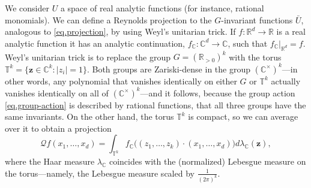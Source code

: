 \documentclass[twoside,11pt]{article}
\begin{document}
We consider $U$ a space of real analytic functions (for instance, rational monomials). We can define a Reynolds projection to the $G$-invariant functions $\bar U$, analogous to \eqref{eq.projection}, by using Weyl's unitarian trick. If $f: \mathbb R^d \to \mathbb R$ is a real analytic function it has an analytic continuation, $f_{\mathbb C}: \mathbb C^d \to \mathbb C$, such that $f_{\mathbb C}|_{\mathbb R^d} = f$. Weyl's unitarian trick is to replace the group $G = (\mathbb R_{> 0})^k$ with the torus %
$\mathbb T^k={ \{\mathbf z\in \mathbb C^k: |z_i|=1 \}}$. Both groups are Zariski-dense in the group $(\mathbb C^\times)^k$---in other words, any polynomial that vanishes identically on either $G$ or $\mathbb T^k$ actually vanishes identically on all of $(\mathbb C^\times)^k$---and it follows, because the group action \eqref{eq.group-action} is described by rational functions, that all three groups have the same invariants. On the other hand, the torus $\mathbb T^k$ is compact, so we can average over it to obtain a projection
\begin{equation}
    \mathcal Q f(x_1, \ldots, x_d) =   \int_{\mathbb{T}^k} f_{\mathbb C} \big( (z_1, \ldots, z_k) \cdot ( x_1, \ldots, x_d )\big) d\lambda_{\mathbb C}(\mathbf z), \label{eq.proj.complex}
\end{equation}
where the Haar measure $\lambda_{\mathbb C}$ coincides with the (normalized) Lebesgue measure on the torus---namely, the Lebesgue measure scaled by $\frac{1}{(2\pi)^k}$.
\end{document}
